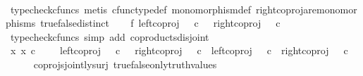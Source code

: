 \begin{isabellebody}
\ \ \ \ \isamarkupfalse%
\ {\isacharparenleft}{\kern0pt}typecheck{\isacharunderscore}{\kern0pt}cfuncs{\isacharcomma}{\kern0pt}\ metis\ cfunc{\isacharunderscore}{\kern0pt}type{\isacharunderscore}{\kern0pt}def\ monomorphism{\isacharunderscore}{\kern0pt}def\ right{\isacharunderscore}{\kern0pt}coproj{\isacharunderscore}{\kern0pt}are{\isacharunderscore}{\kern0pt}monomorphisms\ true{\isacharunderscore}{\kern0pt}false{\isacharunderscore}{\kern0pt}distinct{\isacharparenright}{\kern0pt}\isanewline
\ \ \isamarkupfalse%
\ f{}{\isacharcolon}{\kern0pt}\ {\isachardoublequoteopen}{\isacharparenleft}{\kern0pt}left{\isacharunderscore}{\kern0pt}coproj\ {\isasymOmega}\ {\isasymOmega}{\isacharparenright}{\kern0pt}\ {\isasymcirc}\isactrlsub c\ {\isasymf}\ {\isasymnoteq}\ {\isacharparenleft}{\kern0pt}right{\isacharunderscore}{\kern0pt}coproj\ {\isasymOmega}\ {\isasymOmega}{\isacharparenright}{\kern0pt}\ {\isasymcirc}\isactrlsub c\ {\isasymf}{\isachardoublequoteclose}\isanewline
\ \ \ \ \isamarkupfalse%
\ {\isacharparenleft}{\kern0pt}typecheck{\isacharunderscore}{\kern0pt}cfuncs{\isacharcomma}{\kern0pt}\ simp\ add{\isacharcolon}{\kern0pt}\ coproducts{\isacharunderscore}{\kern0pt}disjoint{\isacharparenright}{\kern0pt}\isanewline
\ \ \isanewline
\ \ \isamarkupfalse%
\ {\isachardoublequoteopen}{\isacharbraceleft}{\kern0pt}x{\isachardot}{\kern0pt}\ x\ {\isasymin}\isactrlsub c\ {\isasymOmega}\ {\isasymCoprod}\ {\isasymOmega}{\isacharbraceright}{\kern0pt}\ {\isacharequal}{\kern0pt}\ {\isacharbraceleft}{\kern0pt}{\isacharparenleft}{\kern0pt}left{\isacharunderscore}{\kern0pt}coproj\ {\isasymOmega}\ {\isasymOmega}{\isacharparenright}{\kern0pt}\ {\isasymcirc}\isactrlsub c\ {\isasymt}\ {\isacharcomma}{\kern0pt}\ {\isacharparenleft}{\kern0pt}right{\isacharunderscore}{\kern0pt}coproj\ {\isasymOmega}\ {\isasymOmega}{\isacharparenright}{\kern0pt}\ {\isasymcirc}\isactrlsub c\ {\isasymt}{\isacharcomma}{\kern0pt}\ {\isacharparenleft}{\kern0pt}left{\isacharunderscore}{\kern0pt}coproj\ {\isasymOmega}\ {\isasymOmega}{\isacharparenright}{\kern0pt}\ {\isasymcirc}\isactrlsub c\ {\isasymf}{\isacharcomma}{\kern0pt}\ {\isacharparenleft}{\kern0pt}right{\isacharunderscore}{\kern0pt}coproj\ {\isasymOmega}\ {\isasymOmega}{\isacharparenright}{\kern0pt}\ {\isasymcirc}\isactrlsub c\ {\isasymf}{\isacharbraceright}{\kern0pt}{\isachardoublequoteclose}\isanewline
\ \ \ \ \isamarkupfalse%
\ coprojs{\isacharunderscore}{\kern0pt}jointly{\isacharunderscore}{\kern0pt}surj\ true{\isacharunderscore}{\kern0pt}false{\isacharunderscore}{\kern0pt}only{\isacharunderscore}{\kern0pt}truth{\isacharunderscore}{\kern0pt}values\ \isanewline

\end{isabellebody}
